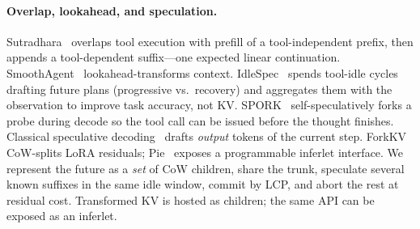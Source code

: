 \paragraph{Overlap, lookahead, and speculation.}
Sutradhara~\cite{sutradhara} overlaps tool execution with prefill of a tool-independent prefix, then appends a tool-dependent suffix---one expected linear continuation.
SmoothAgent~\cite{smoothagent} lookahead-transforms context.
IdleSpec~\cite{idlespec} spends tool-idle cycles drafting future plans (progressive vs.\ recovery) and aggregates them with the observation to improve task accuracy, not KV.
SPORK~\cite{spork} self-speculatively forks a probe during decode so the tool call can be issued before the thought finishes.
Classical speculative decoding~\cite{speculative,medusa,eagledraft} drafts \emph{output} tokens of the current step.
ForkKV~\cite{forkkv} CoW-splits LoRA residuals; Pie~\cite{pie} exposes a programmable inferlet interface.
We represent the future as a \emph{set} of CoW children, share the trunk, speculate several known suffixes in the same idle window, commit by LCP, and abort the rest at residual cost. Transformed KV is hosted as children; the same API can be exposed as an inferlet.

